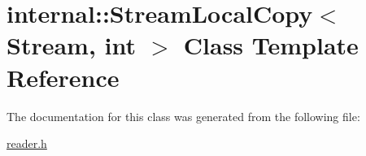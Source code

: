 \hypertarget{a02320}{}\section{internal\+:\+:Stream\+Local\+Copy$<$ Stream, int $>$ Class Template Reference}
\label{a02320}


The documentation for this class was generated from the following file\+:\begin{DoxyCompactItemize}
\item 
\hyperlink{a00563}{reader.\+h}\end{DoxyCompactItemize}
